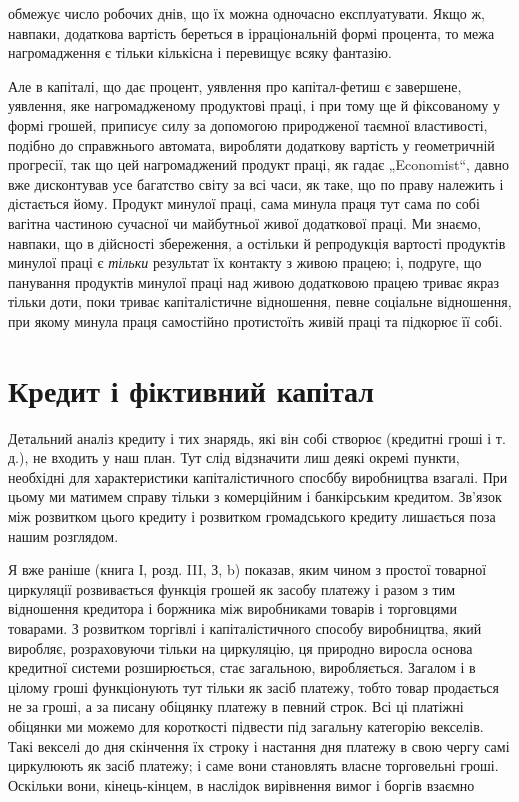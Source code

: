 \parcont{}  %
обмежує число робочих днів, що їх можна одночасно експлуатувати.
Якщо ж, навпаки, додаткова вартість береться в ірраціональній
формі процента, то межа нагромадження є тільки кількісна
і перевищує всяку фантазію.

Але в капіталі, що дає процент, уявлення про капітал-фетиш
є завершене, уявлення, яке нагромадженому продуктові праці,
і при тому ще й фіксованому у формі грошей, приписує силу за
допомогою природженої таємної властивості, подібно до справжнього
автомата, виробляти додаткову вартість у геометричній
прогресії, так що цей нагромаджений продукт праці, як гадає
„Economist“, давно вже дисконтував усе багатство світу за всі
часи, як таке, що по праву належить і дістається йому. Продукт
минулої праці, сама минула праця тут сама по собі вагітна частиною
сучасної чи майбутньої живої додаткової праці. Ми знаємо,
навпаки, що в дійсності збереження, а остільки й репродукція
вартості продуктів минулої праці є \emph{тільки} результат їх
контакту з живою працею; і, подруге, що панування продуктів
минулої праці над живою додатковою працею триває якраз тільки
доти, поки триває капіталістичне відношення, певне соціальне
відношення, при якому минула праця самостійно протистоїть
живій праці та підкорює її собі.

\section{Кредит і фіктивний капітал}

Детальний аналіз кредиту і тих знарядь, які він собі створює
(кредитні гроші і т. д.), не входить у наш план. Тут слід відзначити
лиш деякі окремі пункти, необхідні для характеристики
капіталістичного спосббу виробництва взагалі. При цьому ми
матимем справу тільки з комерційним і банкірським кредитом.
Зв’язок між розвитком цього кредиту і розвитком громадського
кредиту лишається поза нашим розглядом.

Я вже раніше (книга І, розд. III, З, b) показав, яким чином
з простої товарної циркуляції розвивається функція грошей як
засобу платежу і разом з тим відношення кредитора і боржника
між виробниками товарів і торговцями товарами. З розвитком
торгівлі і капіталістичного способу виробництва, який
виробляє, розраховуючи тільки на циркуляцію, ця природно виросла
основа кредитної системи розширюється, стає загальною,
виробляється. Загалом і в цілому гроші функціонують тут тільки
як засіб платежу, тобто товар продається не за гроші, а за
писану обіцянку платежу в певний строк. Всі ці платіжні обіцянки
ми можемо для короткості підвести під загальну категорію
векселів. Такі векселі до дня скінчення їх строку і настання
дня платежу в свою чергу самі циркулюють як засіб платежу;
і саме вони становлять власне торговельні гроші. Оскільки вони,
кінець-кінцем, в наслідок вирівнення вимог і боргів взаємно
\parbreak{}  %
